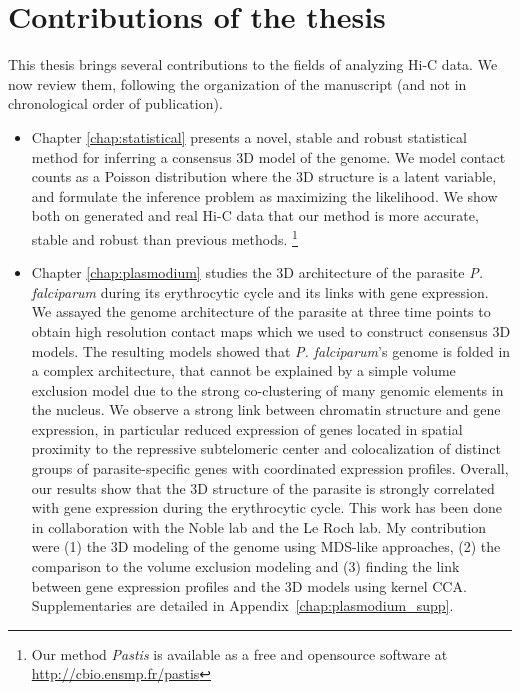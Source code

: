 \section{Contributions of the thesis}

This thesis brings several contributions to the fields of analyzing Hi-C data.
We now review them, following the organization of the manuscript (and not in
chronological order of publication).

\begin{itemize}

\item Chapter \ref{chap:statistical} presents a novel, stable and robust
statistical method for inferring a consensus 3D model of the genome. We model
contact counts as a Poisson distribution where the 3D structure is a latent
variable, and formulate the inference problem as maximizing the likelihood. We
show both on generated and real Hi-C data that our method is more accurate,
stable and robust than previous methods. \footnote{Our method \textit{Pastis}
is available as a free and opensource software at
\url{http://cbio.ensmp.fr/pastis}}

\item Chapter \ref{chap:plasmodium} studies the 3D architecture of the
parasite {\em P. falciparum} during its erythrocytic cycle and its links with
gene expression. We assayed the genome architecture of the parasite at three
time points to obtain high resolution contact maps which we used to construct
consensus 3D models. The resulting models showed that {\em P. falciparum}'s
genome is folded in a complex architecture, that cannot be explained by a
simple volume exclusion model due to the strong co-clustering of many genomic
elements in the nucleus. We observe a strong link between chromatin structure
and gene expression, in particular reduced expression of genes located in
spatial proximity to the repressive subtelomeric center and colocalization of
distinct groups of parasite-specific genes with coordinated expression
profiles. Overall, our results show that the 3D structure of the parasite is
strongly correlated with gene expression during the erythrocytic cycle. This
work has been done in collaboration with the Noble lab and the Le Roch lab. My
contribution were (1) the 3D modeling of the genome using MDS-like approaches,
(2) the comparison to the volume exclusion modeling and (3) finding the link
between gene expression profiles and the 3D models using kernel CCA.
Supplementaries are detailed in Appendix~\ref{chap:plasmodium_supp}.


\end{itemize}
